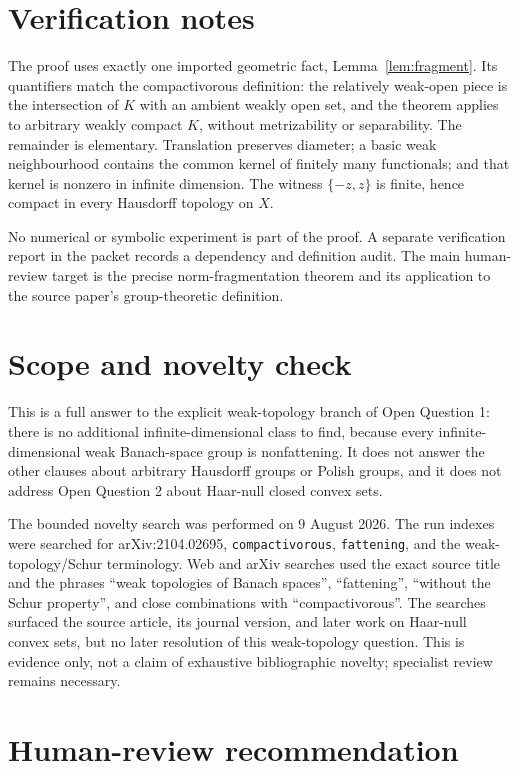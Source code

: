 \documentclass[11pt]{article}
\begin{document}
\section{Verification notes}

The proof uses exactly one imported geometric fact, Lemma~\ref{lem:fragment}.
Its quantifiers match the compactivorous definition: the relatively weak-open
piece is the intersection of $K$ with an ambient weakly open set, and the
theorem applies to arbitrary weakly compact $K$, without metrizability or
separability.  The remainder is elementary.  Translation preserves diameter;
a basic weak neighbourhood contains the common kernel of finitely many
functionals; and that kernel is nonzero in infinite dimension.  The witness
$\{-z,z\}$ is finite, hence compact in every Hausdorff topology on $X$.

No numerical or symbolic experiment is part of the proof.  A separate
verification report in the packet records a dependency and definition audit.
The main human-review target is the precise norm-fragmentation theorem and its
application to the source paper's group-theoretic definition.

\section{Scope and novelty check}

This is a full answer to the explicit weak-topology branch of Open Question 1:
there is no additional infinite-dimensional class to find, because every
infinite-dimensional weak Banach-space group is nonfattening.  It does not
answer the other clauses about arbitrary Hausdorff groups or Polish groups,
and it does not address Open Question 2 about Haar-null closed convex sets.

The bounded novelty search was performed on 9 August 2026.  The run indexes
were searched for arXiv:2104.02695, \texttt{compactivorous},
\texttt{fattening}, and the weak-topology/Schur terminology.  Web and arXiv
searches used the exact source title and the phrases
``weak topologies of Banach spaces'', ``fattening'',
``without the Schur property'', and close combinations with
``compactivorous''.  The searches surfaced the source article, its journal
version, and later work on Haar-null convex sets, but no later resolution of
this weak-topology question.  This is evidence only, not a claim of exhaustive
bibliographic novelty; specialist review remains necessary.

\section{Human-review recommendation}
\end{document}

